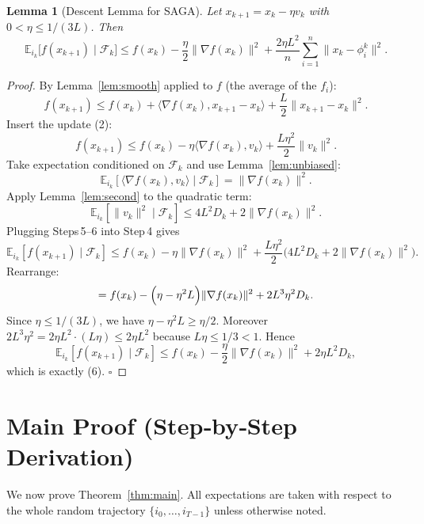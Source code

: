 \documentclass{article}
\newtheorem{lemma}{Lemma}
\newcommand{\E}{\mathbb{E}}
\begin{document}
\begin{lemma}[Descent Lemma for SAGA]\label{lem:descent}
Let $x_{k+1}=x_k-\eta v_k$ with $0<\eta\le 1/(3L)$.  Then
\[
\E_{i_k}\!\bigl[f(x_{k+1})\mid\mathcal{F}_k\bigr]
\le f(x_k)-\frac{\eta}{2}\|\nabla f(x_k)\|^{2}
+\frac{2\eta L^{2}}{n}\sum_{i=1}^{n}\|x_k-\phi_i^k\|^{2}.
\tag{6}
\]
\end{lemma}
\begin{proof}
By Lemma~\ref{lem:smooth} applied to $f$ (the average of the $f_i$):
\[
f(x_{k+1})\le f(x_k)+\langle\nabla f(x_k),x_{k+1}-x_k\rangle+\frac{L}{2}\|x_{k+1}-x_k\|^{2}.
\]
Insert the update (2):
\[
f(x_{k+1})\le f(x_k)-\eta\langle\nabla f(x_k),v_k\rangle+\frac{L\eta^{2}}{2}\|v_k\|^{2}. \tag{Step 4}
\]
Take expectation conditioned on $\mathcal{F}_k$ and use Lemma~\ref{lem:unbiased}:
\[
\E_{i_k}[\langle\nabla f(x_k),v_k\rangle\mid\mathcal{F}_k]
= \|\nabla f(x_k)\|^{2}. \tag{Step 5}
\]
Apply Lemma~\ref{lem:second} to the quadratic term:
\[
\E_{i_k}[\|v_k\|^{2}\mid\mathcal{F}_k]
\le 4L^{2}D_k+2\|\nabla f(x_k)\|^{2}. \tag{Step 6}
\]
Plugging Steps 5–6 into Step 4 gives
\[
\E_{i_k}[f(x_{k+1})\mid\mathcal{F}_k]
\le f(x_k)-\eta\|\nabla f(x_k)\|^{2}
+\frac{L\eta^{2}}{2}\bigl(4L^{2}D_k+2\|\nabla f(x_k)\|^{2}\bigr).
\]
Rearrange:
\[
= f(x_k)-\Bigl(\eta-\eta^{2}L\Bigr)\|\nabla f(x_k)\|^{2}
+2L^{3}\eta^{2}D_k.
\]
Since $\eta\le 1/(3L)$, we have $\eta-\eta^{2}L\ge \eta/2$.  Moreover $2L^{3}\eta^{2}=2\eta L^{2}\cdot(L\eta)\le 2\eta L^{2}$ because $L\eta\le 1/3<1$.  Hence
\[
\E_{i_k}[f(x_{k+1})\mid\mathcal{F}_k]
\le f(x_k)-\frac{\eta}{2}\|\nabla f(x_k)\|^{2}
+2\eta L^{2}D_k,
\]
which is exactly (6). \hfill $\square$
\end{proof}

\section*{Main Proof (Step‑by‑Step Derivation)}
We now prove Theorem~\ref{thm:main}.  All expectations are taken with respect to the whole random trajectory $\{i_0,\dots,i_{T-1}\}$ unless otherwise noted.
\end{document}
